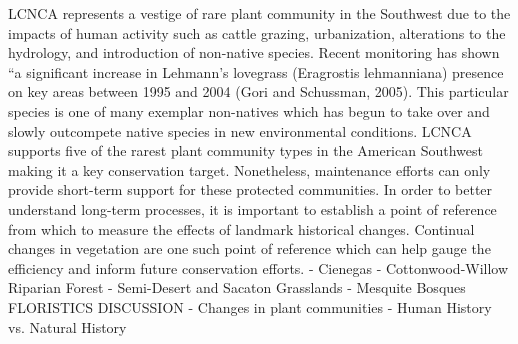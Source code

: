 \documentclass{article}
\begin{document}
LCNCA represents a vestige of rare plant community in the Southwest due to the impacts of human activity such as cattle grazing, urbanization, alterations to the hydrology, and introduction of non-native species. Recent monitoring has shown “a significant increase in Lehmann’s lovegrass (Eragrostis lehmanniana) presence on key areas between 1995 and 2004 (Gori and Schussman, 2005). This particular species is one of many exemplar non-natives which has begun to take over and slowly outcompete native species in new environmental conditions. LCNCA supports five of the rarest plant community types in the American Southwest making it a key conservation target. Nonetheless, maintenance efforts can only provide short-term support for these protected communities. In order to better understand long-term processes, it is important to establish a point of reference from which to measure the effects of landmark historical changes. Continual changes in vegetation are one such point of reference which can help gauge the efficiency and inform future conservation efforts. 
-	Cienegas
-	Cottonwood-Willow Riparian Forest
-	Semi-Desert and Sacaton Grasslands
-	Mesquite Bosques
FLORISTICS
DISCUSSION
-	Changes in plant communities
-	Human History vs. Natural History 
\end{document}
